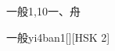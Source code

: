 \begin{entry}{一般}{1,10}{⼀、⾈}
  \begin{phonetics}{一般}{yi4ban1}[][HSK 2]
  \end{phonetics}
\end{entry}
